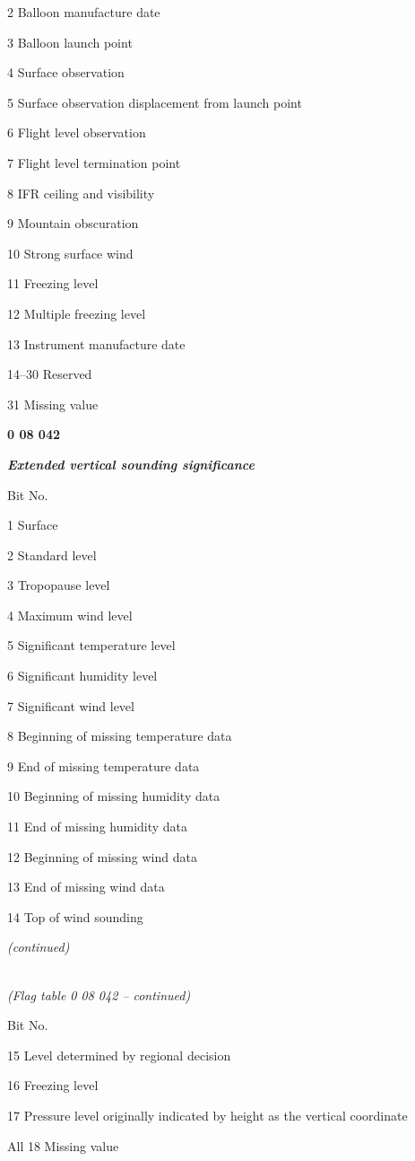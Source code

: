 2 Balloon manufacture date

3 Balloon launch point

4 Surface observation

5 Surface observation displacement from launch point

6 Flight level observation

7 Flight level termination point

8 IFR ceiling and visibility

9 Mountain obscuration

10 Strong surface wind

11 Freezing level

12 Multiple freezing level

13 Instrument manufacture date

14--30 Reserved

31 Missing value

\textbf{0 08 042}

\emph{\textbf{Extended vertical sounding significance}}

Bit No.

1 Surface

2 Standard level

3 Tropopause level

4 Maximum wind level

5 Significant temperature level

6 Significant humidity level

7 Significant wind level

8 Beginning of missing temperature data

9 End of missing temperature data

10 Beginning of missing humidity data

11 End of missing humidity data

12 Beginning of missing wind data

13 End of missing wind data

14 Top of wind sounding

\emph{(continued)}

\emph{\\
(Flag table 0 08 042 -- continued)}

Bit No.

15 Level determined by regional decision

16 Freezing level

17 Pressure level originally indicated by height as the vertical coordinate

All 18 Missing value

